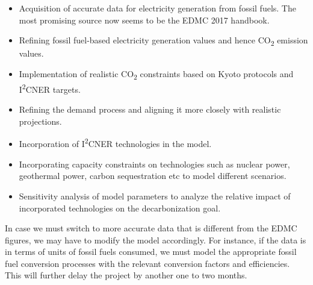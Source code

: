 \documentclass[14pt,a4paper]{article} %
\begin{document}
\begin{itemize}

\item Acquisition of accurate data for electricity generation from fossil fuels. The most promising source now seems to be the EDMC 2017 handbook.

\item Refining fossil fuel-based electricity generation values and hence CO\textsubscript{2} emission values.

\item Implementation of realistic CO\textsubscript{2} constraints based on Kyoto protocols and I\textsuperscript{2}CNER targets.

\item Refining the demand process and aligning it more closely with realistic projections.

\item Incorporation of I\textsuperscript{2}CNER technologies in the model.

\item Incorporating capacity constraints on technologies such as nuclear power, geothermal power, carbon sequestration etc to model different scenarios.

\item Sensitivity analysis of model parameters to analyze the relative impact of incorporated technologies on the decarbonization goal.

\end{itemize}

In case we must switch to more accurate data that is different from the EDMC figures, we may have to modify the model accordingly. For instance, if the data is in terms of units of fossil fuels consumed, we must model the appropriate fossil fuel conversion processes with the relevant conversion factors and efficiencies. This will further delay the project by another one to two months.



%


%

\end{document}
